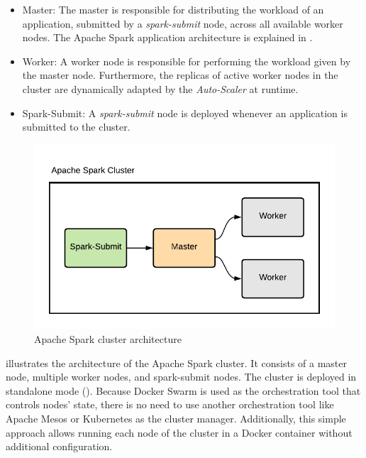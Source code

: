 \begin{itemize}
\item Master: The master is responsible for distributing the workload of an application, submitted by a \textit{spark-submit} node, across all available worker nodes. The Apache Spark application architecture is explained in .

\item Worker: A worker node is responsible for performing the workload given by the master node. Furthermore, the replicas of active worker nodes in the cluster are dynamically adapted by the \textit{Auto-Scaler} at runtime.

\item Spark-Submit: A \textit{spark-submit} node is deployed whenever an application is submitted to the cluster.
\end{itemize}
\begin{figure}[h]
\centering
\includegraphics[scale=1]{images/05_conceptual_design/apache_spark/apache_spark_cluster}
\caption{Apache Spark cluster architecture}
\label{fig:05_spark_arch}
\end{figure}
 illustrates the architecture of the Apache Spark cluster. It consists of a master node, multiple worker nodes, and spark-submit nodes.
The cluster is deployed in standalone mode (). Because Docker Swarm is used as the orchestration tool that controls nodes' state, there is no need to use another orchestration tool like Apache Mesos or Kubernetes as the cluster manager.
Additionally, this simple approach allows running each node of the cluster in a Docker container without additional configuration.


